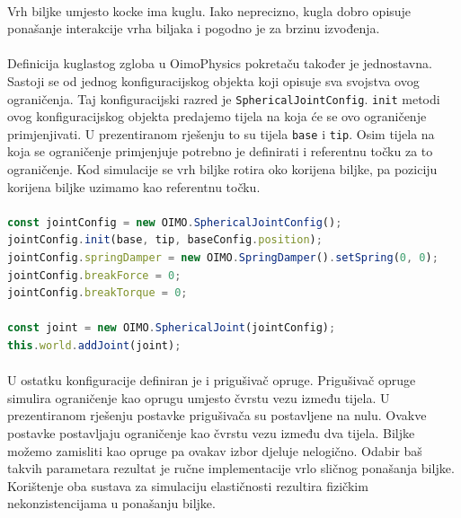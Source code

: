 \documentclass[times, utf8, diplomski]{fer}
\begin{document}
\paragraph{}
Vrh biljke umjesto kocke ima kuglu. Iako neprecizno, kugla dobro opisuje ponašanje 	
interakcije vrha biljaka i pogodno je za brzinu izvođenja.

\paragraph{}
Definicija kuglastog zgloba u OimoPhysics pokretaču također je jednostavna. Sastoji se od
jednog konfiguracijskog objekta koji opisuje sva svojstva ovog ograničenja.
Taj konfiguracijski razred je \verb#SphericalJointConfig#. \verb#init# metodi ovog 
konfiguracijskog objekta predajemo tijela na koja će se ovo ograničenje primjenjivati. U 
prezentiranom rješenju to su tijela \verb#base# i \verb#tip#. Osim tijela na koja se 
ograničenje primjenjuje potrebno je definirati i referentnu točku za to ograničenje. Kod 
simulacije se vrh biljke rotira oko korijena biljke, pa poziciju korijena biljke uzimamo kao 
referentnu točku.
\paragraph{}

\begin{lstlisting}[language=Javascript,label=code33-4,caption=Postavljanje kuglastog zgloba]
const jointConfig = new OIMO.SphericalJointConfig();
jointConfig.init(base, tip, baseConfig.position);
jointConfig.springDamper = new OIMO.SpringDamper().setSpring(0, 0);
jointConfig.breakForce = 0;
jointConfig.breakTorque = 0;

const joint = new OIMO.SphericalJoint(jointConfig);
this.world.addJoint(joint);
\end{lstlisting}

\paragraph{}
U ostatku konfiguracije definiran je i prigušivač opruge. Prigušivač opruge simulira 
ograničenje kao oprugu umjesto čvrstu vezu između tijela. U prezentiranom rješenju postavke
prigušivača su postavljene na nulu. Ovakve postavke postavljaju ograničenje kao čvrstu vezu
između dva tijela. Biljke možemo zamisliti kao opruge pa ovakav izbor djeluje nelogično. 
Odabir baš takvih parametara rezultat je ručne implementacije vrlo sličnog ponašanja biljke.
Korištenje oba sustava za simulaciju elastičnosti rezultira fizičkim nekonzistencijama u 
ponašanju biljke.
\end{document}
